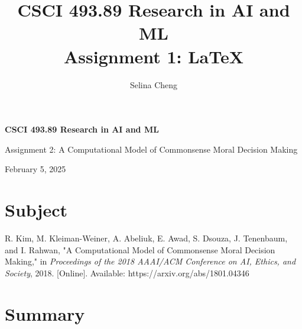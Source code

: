 \documentclass[12pt, letterpaper]{article}
\title{\textbf{CSCI 493.89 Research in AI and ML\\Assignment 1: \LaTeX{}}} %
\author{Selina Cheng} %
\affiliation{CUNY Hunter College} %
\begin{document}
\pagestyle{empty}

    



\vspace{2.5cm}





\newgeometry{} %

\textbf{CSCI 493.89 Research in AI and ML}

Assignment 2: A Computational Model of Commonsense Moral Decision Making

February 5, 2025

\section{Subject}
\label{sec:subject}


R. Kim, M. Kleiman-Weiner, A. Abeliuk, E. Awad, S. Dsouza, J. Tenenbaum, and I. Rahwan, "A Computational Model of Commonsense Moral Decision Making," in \emph{Proceedings of the 2018 AAAI/ACM Conference on AI, Ethics, and Society}, 2018. [Online]. Available: https://arxiv.org/abs/1801.04346

\section{Summary}
\label{sec:summary}
\end{document}
